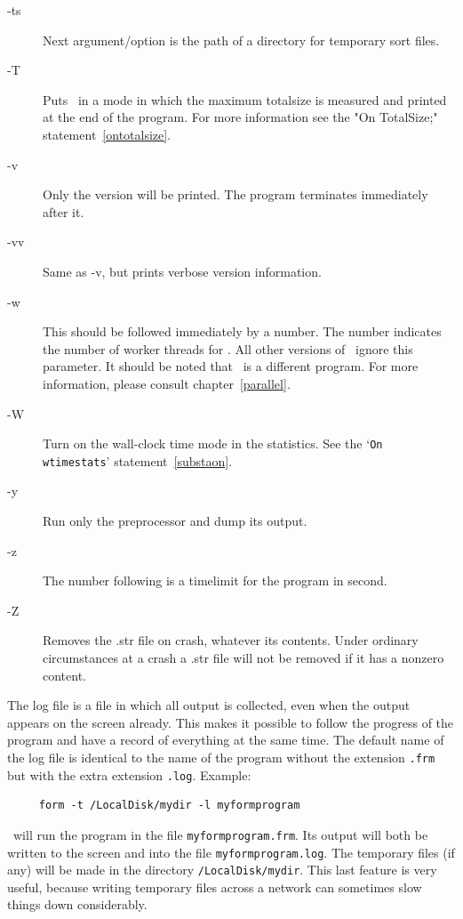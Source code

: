 \begin{description}
\item[-ts] Next argument/option is the path of a directory for temporary sort 
     files.
\item[-T] Puts \FORM\ in a mode in which the maximum 
     totalsize is measured and printed at the end of the program. For more 
     information see the "On TotalSize;" statement~\ref{ontotalsize}.
\item[-v] Only the version will be printed. The program terminates 
     immediately after it.
\item[-vv] Same as -v, but prints verbose version information.
\item[-w] This should be followed immediately by a number. The 
     number indicates the number of worker threads for \TFORM\@. All other 
     versions of \FORM\ ignore this parameter. It should be noted that \TFORM\ 
     is a different program. For more information, please consult 
     chapter~\ref{parallel}.
\item[-W] Turn on the wall-clock time mode in the statistics. 
     See the `\texttt{On wtimestats}' statement~\ref{substaon}.
\item[-y] Run only the preprocessor and dump its output.
\item[-z] The number following is a timelimit for the program in second.
\item[-Z] Removes the .str file on crash, whatever its contents. Under 
     ordinary circumstances at a crash a .str file will not be removed if 
     it has a nonzero content.
\end{description}

\noindent The log file is a file in which all 
output is collected, even when the output appears on the screen already. 
This makes it possible to follow the progress of the program and have a 
record of everything at the same time. The default name of the log file is 
identical to the name of the program without the extension \verb:.frm: but 
with the extra extension \verb:.log:.
Example:
\begin{center}
\begin{verbatim}
     form -t /LocalDisk/mydir -l myformprogram
\end{verbatim}
\end{center}
\FORM\ will run the program in the file \verb:myformprogram.frm:. Its output 
will both be written to the screen and into the file 
\verb:myformprogram.log:. The temporary files (if any) will be made in the 
directory \verb:/LocalDisk/mydir:. This last feature is very useful, 
because writing temporary files across a network can sometimes slow things 
down considerably.

